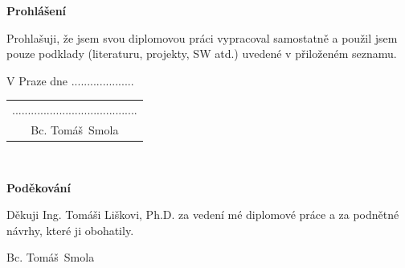 \documentclass[a4paper,11pt,twoside]{report}
\newcommand{\autor}{Bc. Tomáš~Smola}           %
\begin{document}
{\bf Prohlášení} %

\vspace{0.5cm} %
Prohlašuji, že jsem svou diplomovou práci vypracoval samostatně a použil jsem pouze podklady
(literaturu, projekty, SW atd.) uvedené v přiloženém seznamu.

\vspace{5mm}V Praze dne ....................\hfill  %
    \begin{tabular}{c}                               %
    ........................................\\       %
    \autor                                           %
    \end{tabular}                                    %

\newpage
\thispagestyle{empty}

~
\vfill %

{\bf Poděkování}

\vspace{5mm} %
Děkuji Ing. Tomáši Liškovi, Ph.D. za vedení mé diplomové práce a za podnětné návrhy, které ji obohatily.

\begin{flushright}
\autor
\end{flushright}  %

\newpage   %
\thispagestyle{empty}   %

\newbox\odstavecbox
\newlength\vyskaodstavce
\newcommand\odstavec[2]{%
    \setbox\odstavecbox=\hbox{%
         \parbox[t]{#1}{#2\vrule width 0pt depth 4pt}}%
    \global\vyskaodstavce=\dp\odstavecbox
    \box\odstavecbox}
\newcommand{\delka}{120mm} %
\end{document}
